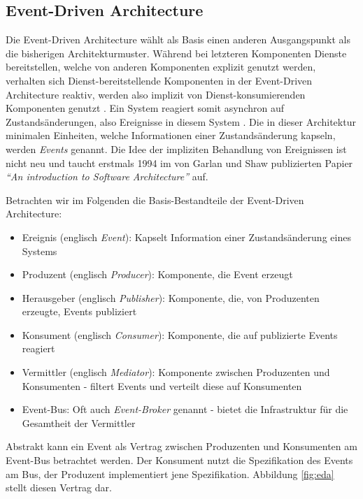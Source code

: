 \documentclass[acmtog]{acmart}
\begin{document}
\subsection{Event-Driven Architecture}
Die Event-Driven Architecture wählt als Basis einen anderen Ausgangspunkt als die bisherigen Architekturmuster.
Während bei letzteren Komponenten Dienste bereitstellen, welche von anderen Komponenten explizit genutzt werden,
verhalten sich Dienst-bereitstellende Komponenten in der Event-Driven Architecture reaktiv,
werden also implizit von Dienst-konsumierenden Komponenten genutzt \cite{garlanShawImplizit}.
Ein System reagiert somit asynchron auf Zustandsänderungen, also Ereignisse in diesem System \cite{eda}.
Die in dieser Architektur minimalen Einheiten, welche Informationen einer Zustandsänderung kapseln, werden \textit{Events} genannt.
Die Idee der impliziten Behandlung von Ereignissen ist nicht neu und taucht erstmals 1994 im von Garlan und Shaw publizierten Papier
\textit{\enquote{An introduction to Software Architecture}} auf.

Betrachten wir im Folgenden die Basis-Bestandteile der Event-Driven Architecture:
\begin{itemize}
  \item Ereignis (englisch \textit{Event}): Kapselt Information einer Zustandsänderung eines Systems
  \item Produzent (englisch \textit{Producer}): Komponente, die Event erzeugt
  \item Herausgeber (englisch \textit{Publisher}): Komponente, die, von Produzenten erzeugte, Events publiziert
  \item Konsument (englisch \textit{Consumer}): Komponente, die auf publizierte Events reagiert
  \item Vermittler (englisch \textit{Mediator}): Komponente zwischen Produzenten und Konsumenten - filtert Events und verteilt diese auf Konsumenten
  \item Event-Bus: Oft auch \textit{Event-Broker} genannt - bietet die Infrastruktur für die Gesamtheit der Vermittler
\end{itemize}
Abstrakt kann ein Event als Vertrag zwischen Produzenten und Konsumenten am Event-Bus betrachtet werden.
Der Konsument nutzt die Spezifikation des Events am Bus, der Produzent implementiert jene Spezifikation.
Abbildung \ref{fig:eda} stellt diesen Vertrag dar.
\end{document}
